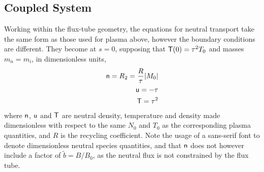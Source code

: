 \subsection{Coupled System}\label{sec:sys23coupled}
Working within the flux-tube geometry, the equations for neutral transport
take the same form as those used for plasma above,
however the boundary conditions are different.
They become at $s=0$, supposing that ${\sf T}(0)=\tau^2 T_0$ and masses~$m_n=m_i$, in dimensionless units,
\begin{eqnarray}
\label{eq:bcnn} {\sf n}=R_2=\frac{R}{\tau}|M_0| \\
\label{eq:bcnu} {\sf u}=-\tau \\
\label{eq:bcnt} {\sf T}=\tau^2 
\end{eqnarray}
where ${\sf n}$, ${\sf u}$ and ${\sf T}$ are neutral density, temperature and density made
dimensionless with respect to the same $N_0$ and $T_0$ as the corresponding plasma quantities,
and $R$ is the recycling coefficient. Note the usage of a sans-serif font to denote
dimensionless neutral species quantities, and that ${\sf n}$ does not however include a factor of
$\tilde{b}=B/B_0$, as the neutral flux is not constrained by the flux tube.


